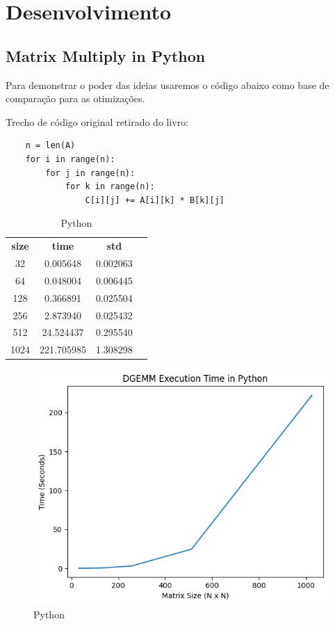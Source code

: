 \documentclass[12pt]{article}
\begin{document}
\newpage
\newpage

\section{Desenvolvimento}

\subsection{Matrix Multiply in Python}

Para demonstrar o poder das ideias usaremos o código abaixo como base de comparação para as otimizações.

Trecho de código original retirado do livro:

\begin{lstlisting}
    n = len(A)
    for i in range(n):
        for j in range(n):
            for k in range(n):
                C[i][j] += A[i][k] * B[k][j]
\end{lstlisting}

\begin{table}[h]
    \centering
    \label{tab:python}
    \begin{tabular}{cccc}
        \textbf{size} & \textbf{time} & \textbf{std} \\
        32 & 0.005648 & 0.002063 \\
        64 & 0.048004 & 0.006445 \\
        128 & 0.366891 & 0.025504 \\
        256 & 2.873940 & 0.025432 \\
        512 & 24.524437 & 0.295540 \\
        1024 & 221.705985 & 1.308298 \\
    \end{tabular}
    \caption{Python}
\end{table}

\begin{figure}[h]
    \centering
    \includegraphics[scale=0.6]{figures/python.png}
    \caption{Python}
    \label{fig:python}
\end{figure}
\end{document}

